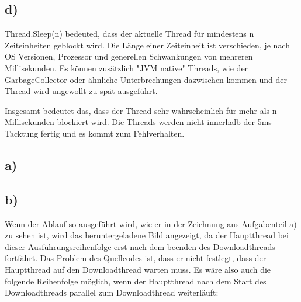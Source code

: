 \documentclass[ngerman]{fbi-aufgabenblatt}
\begin{document}
\subsection*{d)}
Thread.Sleep(n) bedeuted, dass der aktuelle Thread für mindestens n Zeiteinheiten geblockt wird. Die Länge einer Zeiteinheit ist verschieden, je nach OS Versionen, Prozessor und generellen Schwankungen von mehreren Millisekunden. 
Es können zusätzlich "JVM native" Threads, wie der GarbageCollector oder ähnliche Unterbrechungen dazwischen kommen und der Thread wird ungewollt zu spät ausgeführt.

Insgesamt bedeutet das, dass der Thread sehr wahrscheinlich für mehr als n Millisekunden blockiert wird.
Die Threads werden nicht innerhalb der 5ms Tacktung fertig und es kommt zum Fehlverhalten.


\subsection*{a)}
\subsection*{b)}
Wenn der Ablauf so ausgeführt wird, wie er in der Zeichnung aus Aufgabenteil a) zu sehen ist, wird das heruntergeladene Bild angezeigt, da der Hauptthread bei dieser Ausführungsreihenfolge erst nach dem beenden des Downloadthreads fortfährt. Das Problem des Quellcodes ist, dass er nicht festlegt, dass der Hauptthread auf den Downloadthread warten muss. Es wäre also auch die folgende Reihenfolge möglich, wenn der Hauptthread nach dem Start des Downloadthreads parallel zum Downloadthread weiterläuft: \\
\end{document}
